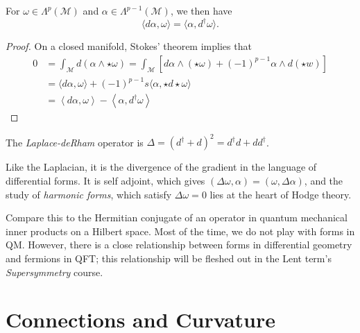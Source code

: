 \begin{claim}
  For $\omega \in \Lambda^p(\mathcal{M})$ and $\alpha \in \Lambda^{p-1}(\mathcal{M})$, we then have
  \begin{equation}
    \langle d\alpha, \omega \rangle = \langle \alpha, d^{\dagger}\omega \rangle.
  \end{equation}
\end{claim}
\begin{proof}
  On a closed manifold, Stokes' theorem implies that
  \begin{align}
    0 &= \int_{\mathcal{M}} d(\alpha \wedge \star\omega) = \int_{\mathcal{M}} \left[ d\alpha \wedge (\star \omega) + (-1)^{p-1} \alpha \wedge d(\star w) \right]   \\
      &= \langle d\alpha, \omega\rangle 
      + (-1)^{p-1} s \langle \alpha, \star d\star\omega \rangle \\
      &= \left\langle d \alpha, \omega \right\rangle - \left\langle \alpha, d^{\dagger} \omega \right\rangle
  \end{align}
\end{proof}

\begin{definition}[]
  The \emph{Laplace-deRham} operator is $\Delta = (d^{\dagger} + d)^2 = d^{\dagger} d + d d^{\dagger}$.
\end{definition}
Like the Laplacian, it is the divergence of the gradient in the language of differential forms. It is self adjoint, which gives $(\Delta \omega, \alpha) = (\omega, \Delta \alpha)$, and the study of \emph{harmonic forms}, which satisfy $\Delta \omega = 0 $ lies at the heart of Hodge theory.

\begin{leftbar}
  \begin{remark}
    Compare this to the Hermitian conjugate of an operator in quantum mechanical inner products on a Hilbert space. Most of the time, we do not play with forms in QM.
    However, there is a close relationship between forms in differential geometry and fermions in QFT; this relationship will be fleshed out in the Lent term's \emph{Supersymmetry} course.
  \end{remark}
\end{leftbar}

\section{Connections and Curvature}%
\label{sec:connections_and_curvature}

